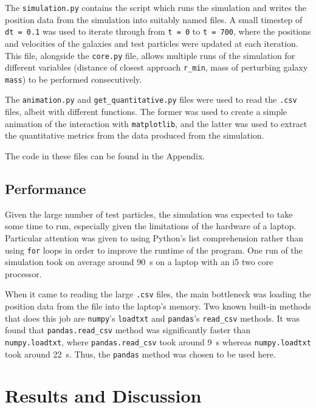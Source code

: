 \documentclass[twoside,twocolumn]{article}
\begin{document}
        The \texttt{simulation.py} contains the script which runs the simulation and writes the position data from the simulation into suitably named files. A small timestep of \texttt{dt = 0.1} was used to iterate through from \texttt{t = 0} to \texttt{t = 700}, where the positions and velocities of the galaxies and test particles were updated at each iteration. This file, alongside the \texttt{core.py} file, allows multiple runs of the simulation for different variables (distance of closest approach \texttt{r\_min}, mass of perturbing galaxy \texttt{mass}) to be performed consecutively.
        
        The \texttt{animation.py} and \texttt{get\_quantitative.py} files were used to read the \texttt{.csv} files, albeit with different functions. The former was used to create a simple animation of the interaction with \texttt{matplotlib}, and the latter was used to extract the quantitative metrics from the data produced from the simulation.

        The code in these files can be found in the Appendix.

        
        
    \subsection{Performance}
    
    Given the large number of test particles, the simulation was expected to take some time to run, especially given the limitations of the hardware of a laptop. Particular attention was given to using Python's list comprehension rather than using \texttt{for} loops in order to improve the runtime of the program. One run of the simulation took on average around \SI{90}{\second} on a laptop with an i5 two core processor.
    
    When it came to reading the large \texttt{.csv} files, the main bottleneck was loading the position data from the file into the laptop's memory. Two known built-in methods that does this job are \texttt{numpy}'s \texttt{loadtxt} and \texttt{pandas}'s \texttt{read\_csv} methods. It was found that \texttt{pandas.read\_csv} method was significantly faster than \texttt{numpy.loadtxt}, where \texttt{pandas.read\_csv} took around \SI{9}{\second} whereas \texttt{numpy.loadtxt} took around \SI{22}{\second}. Thus, the \texttt{pandas} method was chosen to be used here.
        
        
\section{Results and Discussion}   
\end{document}
